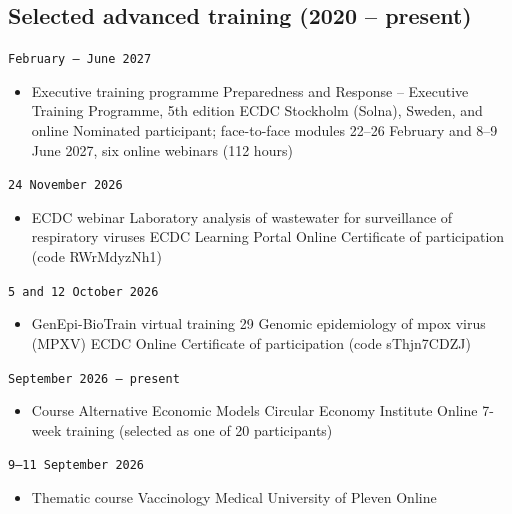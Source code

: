 \documentclass[
  10.5pt,
  a4paper,
  DIV=11,
  numbers=noendperiod]{scrartcl}
\providecommand{\tightlist}{%
  \setlength{\itemsep}{0pt}\setlength{\parskip}{0pt}}
\let\oldtexttt\texttt
\renewcommand{\texttt}[1]{{\color{cvbronze}\small\oldtexttt{#1}}}
\begin{document}
\subsection{Selected advanced training (2020 --
present)}\label{selected-advanced-training-2020-present}

\texttt{February\ –\ June\ 2027}

\begin{itemize}
\tightlist
\item
  Executive training programme \textbar{} Preparedness and Response --
  Executive Training Programme, 5th edition \textbar{} ECDC \textbar{}
  Stockholm (Solna), Sweden, and online \textbar{} Nominated
  participant; face-to-face modules 22--26 February and 8--9 June 2027,
  six online webinars (112 hours)
\end{itemize}

\texttt{24\ November\ 2026}

\begin{itemize}
\tightlist
\item
  ECDC webinar \textbar{} Laboratory analysis of wastewater for
  surveillance of respiratory viruses \textbar{} ECDC Learning Portal
  \textbar{} Online \textbar{} Certificate of participation (code
  RWrMdyzNh1)
\end{itemize}

\texttt{5\ and\ 12\ October\ 2026}

\begin{itemize}
\tightlist
\item
  GenEpi-BioTrain virtual training 29 \textbar{} Genomic epidemiology of
  mpox virus (MPXV) \textbar{} ECDC \textbar{} Online \textbar{}
  Certificate of participation (code sThjn7CDZJ)
\end{itemize}

\texttt{September\ 2026\ –\ present}

\begin{itemize}
\tightlist
\item
  Course \textbar{} Alternative Economic Models \textbar{} Circular
  Economy Institute \textbar{} Online \textbar{} 7-week training
  (selected as one of 20 participants)
\end{itemize}

\texttt{9–11\ September\ 2026}

\begin{itemize}
\tightlist
\item
  Thematic course \textbar{} Vaccinology \textbar{} Medical University
  of Pleven \textbar{} Online
\end{itemize}
\end{document}
